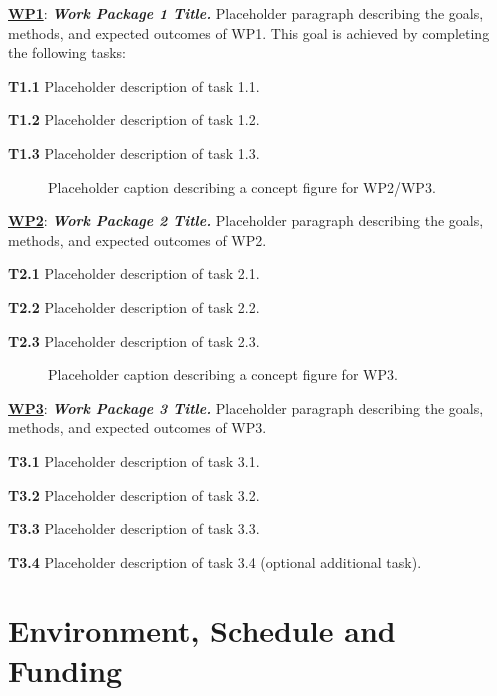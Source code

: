 \documentclass[twocolumn]{NobArticle}
\begin{document}
\noindent \underline{\textbf{WP1}}: \textbf{\textit{Work Package 1 Title.}}
Placeholder paragraph describing the goals, methods, and expected outcomes of WP1. This goal is achieved by completing the following tasks:

\textbf{T1.1} Placeholder description of task 1.1.

\textbf{T1.2} Placeholder description of task 1.2.

\textbf{T1.3} Placeholder description of task 1.3.

\begin{figure}[h!]
\centering
\vspace{-1.5mm}
\caption{\label{fig:placeholder2} Placeholder caption describing a concept figure for WP2/WP3.}
\end{figure}

\noindent \underline{\textbf{WP2}}: \textbf{\textit{Work Package 2 Title.}}
Placeholder paragraph describing the goals, methods, and expected outcomes of WP2.

\textbf{T2.1} Placeholder description of task 2.1.

\textbf{T2.2} Placeholder description of task 2.2.

\textbf{T2.3} Placeholder description of task 2.3.

\begin{figure}[h!]
\centering
\vspace{-1.5mm}
\caption{\label{fig:placeholder3} Placeholder caption describing a concept figure for WP3.}
\end{figure}

\noindent \underline{\textbf{WP3}}: \textbf{\textit{Work Package 3 Title.}}
Placeholder paragraph describing the goals, methods, and expected outcomes of WP3.

\textbf{T3.1} Placeholder description of task 3.1.

\textbf{T3.2} Placeholder description of task 3.2.

\textbf{T3.3} Placeholder description of task 3.3.

\textbf{T3.4} Placeholder description of task 3.4 (optional additional task).

\section{Environment, Schedule and Funding}
\end{document}
